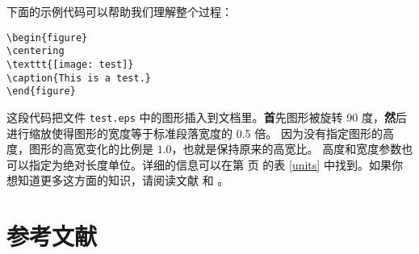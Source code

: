 

下面的示例代码可以帮助我们理解整个过程：
\begin{code}
\begin{verbatim}
\begin{figure}
\centering
\texttt{[image: test]}
\caption{This is a test.}
\end{figure}
\end{verbatim}
\end{code}
这段代码把文件 \texttt{test.eps} 中的图形插入到文档里。{\textbf
首先}图形被旋转 90 度，{\textbf
然后}进行缩放使得图形的宽度等于标准段落宽度的 0.5 倍。
因为没有指定图形的高度，图形的高宽变化的比例是 $1.0$，也就是保持原来的高宽比。
高度和宽度参数也可以指定为绝对长度单位。详细的信息可以在第 \pageref{units} 页
的表 \ref{units} 中找到。如果你想知道更多这方面的知识，请阅读文献 \cite{graphics} 
和 \cite{eps}。

\section{参考文献}

